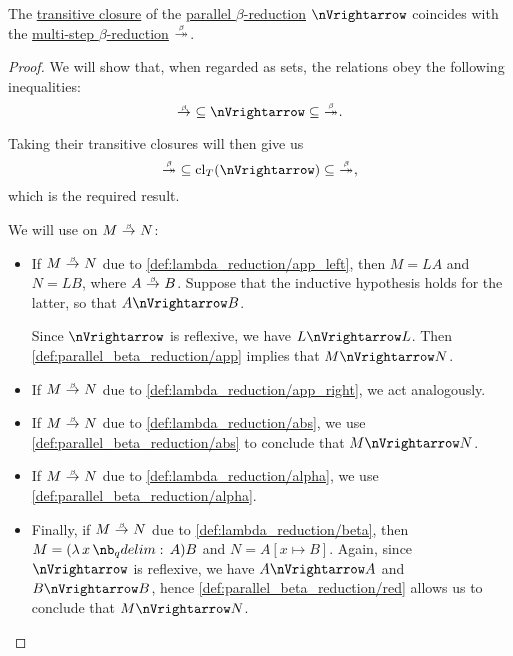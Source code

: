 \begin{proposition}\label{thm:parallel_beta_reduction_transitive_closure}
  The \hyperref[def:relation_closures/transitive]{transitive closure} of the \hyperref[def:parallel_beta_reduction]{parallel \( \beta \)-reduction} \( {\pred} \) coincides with the \hyperref[def:lambda_reduction/reduction]{multi-step \( \beta \)-reduction} \( {\bred*} \).
\end{proposition}
\begin{proof}
  We will show that, when regarded as sets, the relations obey the following inequalities:
  \begin{equation*}
    {\bred} \subseteq {\pred} \subseteq {\bred*}.
  \end{equation*}

  Taking their transitive closures will then give us
  \begin{equation*}
    {\bred*} \subseteq \cl_T({\pred}) \subseteq {\bred*},
  \end{equation*}
  which is the required result.

   We will use  on \( M \bred N \):
  \begin{itemize}
    \item If \( M \bred N \) due to \ref{def:lambda_reduction/app_left}, then \( M = LA \) and \( N = LB \), where \( A \bred B \). Suppose that the inductive hypothesis holds for the latter, so that \( A \pred B \).

    Since \( {\pred} \) is reflexive, we have \( L \pred L \). Then \ref{def:parallel_beta_reduction/app} implies that \( M \pred N \).

    \item If \( M \bred N \) due to \ref{def:lambda_reduction/app_right}, we act analogously.

    \item If \( M \bred N \) due to \ref{def:lambda_reduction/abs}, we use \ref{def:parallel_beta_reduction/abs} to conclude that \( M \pred N \).

    \item If \( M \bred N \) due to \ref{def:lambda_reduction/alpha}, we use \ref{def:parallel_beta_reduction/alpha}.

    \item Finally, if \( M \bred N \) due to \ref{def:lambda_reduction/beta}, then \( M = (\qabs x A) B \) and \( N = A[x \mapsto B] \). Again, since \( {\pred} \) is reflexive, we have \( A \pred A \) and \( B \pred B \), hence \ref{def:parallel_beta_reduction/red} allows us to conclude that \( M \pred N \).
  \end{itemize}


\end{proof}
